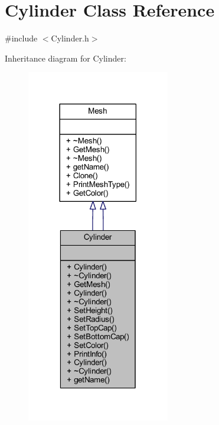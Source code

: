 \hypertarget{class_cylinder}{}\section{Cylinder Class Reference}
\label{class_cylinder}


{\ttfamily \#include $<$Cylinder.\+h$>$}



Inheritance diagram for Cylinder\+:
\nopagebreak
\begin{figure}[H]
\begin{center}
\leavevmode
\includegraphics[width=177pt]{class_cylinder__inherit__graph}
\end{center}
\end{figure}


